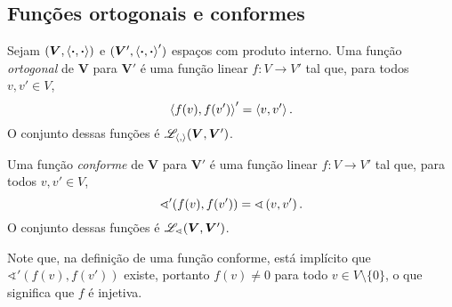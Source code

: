 \subsection{Funções ortogonais e conformes}

\begin{definition}
Sejam $(\bm V,\left\langle{\bm{\cdot}},{\bm{\cdot}}\right\rangle)$ e $(\bm V',\left\langle{\bm{\cdot}},{\bm{\cdot}}\right\rangle')$ espaços com produto interno. Uma função \emph{ortogonal} de $\bm V$ para $\bm V'$ é uma função linear $f\colon V \to V'$ tal que, para todos $v,v' \in V$,
	\begin{equation*}
	\left\langle{f(v)},{f(v')}\right\rangle' = \left\langle{v},{v'}\right\rangle.
	\end{equation*}
O conjunto dessas funções é $\mathscr{L}_{\left\langle{},{}\right\rangle}(\bm V,\bm V')$.

Uma função \emph{conforme} de $\bm V$ para $\bm V'$ é uma função linear $f\colon V \to V'$ tal que, para todos $v,v' \in V$,
	\begin{equation*}
	\sphericalangle'(f(v),f(v')) = \sphericalangle\left({v},{v'}\right).
	\end{equation*}
O conjunto dessas funções é $\mathscr{L}_{\sphericalangle}(\bm V,\bm V')$.
\end{definition}

Note que, na definição de uma função conforme, está implícito que $\sphericalangle'(f(v),f(v'))$ existe, portanto $f(v) \neq 0$ para todo $v \in V \setminus \{0\}$, o que significa que $f$ é injetiva.

